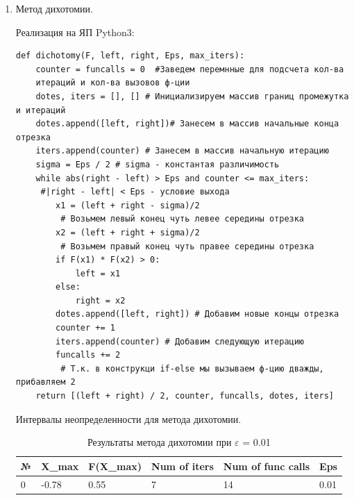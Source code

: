 \documentclass[10pt]{article}
\begin{document}
\begin{enumerate}





\item
\begin{center}
\begin{large}
Метод  дихотомии.\\
\end{large}
\end{center}
Реализация на ЯП Python3:\\
\begin{verbatim}
def dichotomy(F, left, right, Eps, max_iters):
    counter = funcalls = 0  #Заведем перемнные для подсчета кол-ва 
    итераций и кол-ва вызовов ф-ции
    dotes, iters = [], [] # Инициализируем массив границ промежутка и итераций
    dotes.append([left, right])# Занесем в массив начальные конца отрезка
    iters.append(counter) # Занесем в массив начальную итерацию
    sigma = Eps / 2 # sigma - константая различимость
    while abs(right - left) > Eps and counter <= max_iters:
     #|right - left| < Eps - условие выхода
        x1 = (left + right - sigma)/2
         # Возьмем левый конец чуть левее середины отрезка
        x2 = (left + right + sigma)/2
         # Возьмем правый конец чуть правее середины отрезка
        if F(x1) * F(x2) > 0:
            left = x1
        else:
            right = x2
        dotes.append([left, right]) # Добавим новые концы отрезка
        counter += 1
        iters.append(counter) # Добавим следующую итерацию
        funcalls += 2
         # Т.к. в конструкци if-else мы вызываем ф-цию дважды, прибавляем 2
    return [(left + right) / 2, counter, funcalls, dotes, iters]
\end{verbatim}
\newpage
\begin{center}
Интервалы неопределенности для метода дихотомии.
\end{center}


\begin{table}[H]
\caption{Результаты метода дихотомии при $\varepsilon$ = 0.01}
\begin{center}
\begin{tabular}{|l|l|l|l|l|l|}
\hline
№ & X\_max    & F(X\_max) & Num of iters & Num of func calls & Eps  \\
\hline
    0  & -0.78  &    0.55 &               7 &                   14 &
0.01 \\
\hline
\end{tabular}
\end{center}
\end{table}


\end{enumerate}
\end{document}
